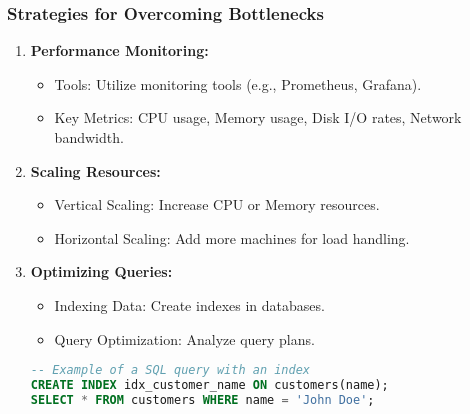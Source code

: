 \documentclass[aspectratio=169]{beamer}
\begin{document}
\begin{frame}[fragile]
    \frametitle{Strategies for Overcoming Bottlenecks}
    \begin{enumerate}
        \item \textbf{Performance Monitoring:}
            \begin{itemize}
                \item Tools: Utilize monitoring tools (e.g., Prometheus, Grafana).
                \item Key Metrics: CPU usage, Memory usage, Disk I/O rates, Network bandwidth.
            \end{itemize}
        \item \textbf{Scaling Resources:}
            \begin{itemize}
                \item Vertical Scaling: Increase CPU or Memory resources.
                \item Horizontal Scaling: Add more machines for load handling.
            \end{itemize}
        \item \textbf{Optimizing Queries:}
            \begin{itemize}
                \item Indexing Data: Create indexes in databases.
                \item Query Optimization: Analyze query plans.
            \end{itemize}
            \begin{lstlisting}[language=SQL]
-- Example of a SQL query with an index
CREATE INDEX idx_customer_name ON customers(name);
SELECT * FROM customers WHERE name = 'John Doe';
            \end{lstlisting}
    \end{enumerate}
\end{frame}
\end{document}
